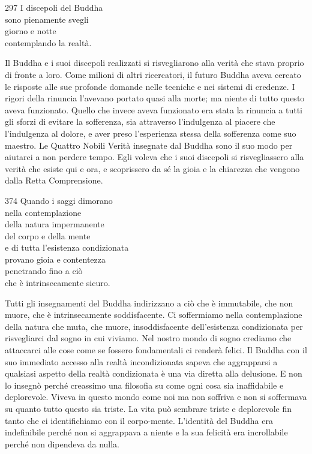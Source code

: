 
\begin{dhpVerse}{297}
\label{dhp-297}
I discepoli del Buddha\\
sono pienamente svegli\\
giorno e notte\\
contemplando la realtà.
\end{dhpVerse}

\begin{dhpRefl}
  Il Buddha e i suoi discepoli realizzati si risvegliarono alla verità che stava
  proprio di fronte a loro. Come milioni di altri ricercatori, il futuro Buddha
  aveva cercato le risposte alle sue profonde domande nelle tecniche e nei
  sistemi di credenze. I rigori della rinuncia l'avevano portato quasi alla
  morte; ma niente di tutto questo aveva funzionato. Quello che invece aveva
  funzionato era stata la rinuncia a tutti gli sforzi di evitare la sofferenza,
  sia attraverso l'indulgenza al piacere che l'indulgenza al dolore, e aver
  preso l'esperienza stessa della sofferenza come suo maestro. Le Quattro Nobili
  Verità insegnate dal Buddha sono il suo modo per aiutarci a non perdere tempo.
  Egli voleva che i suoi discepoli si risvegliassero alla verità che esiste qui
  e ora, e scoprissero da sé la gioia e la chiarezza che vengono dalla Retta
  Comprensione.
\end{dhpRefl}


\begin{dhpVerse}{374}
\label{dhp-374}
Quando i saggi dimorano\\
nella contemplazione\\
della natura impermanente\\
del corpo e della mente\\
e di tutta l'esistenza condizionata\\
provano gioia e contentezza\\
penetrando fino a ciò\\
che è intrinsecamente sicuro.
\end{dhpVerse}

\begin{dhpRefl}
  Tutti gli insegnamenti del Buddha indirizzano a ciò che è immutabile, che non
  muore, che è intrinsecamente soddisfacente. Ci soffermiamo nella
  contemplazione della natura che muta, che muore, insoddisfacente
  dell'esistenza condizionata per risvegliarci dal sogno in cui viviamo. Nel
  nostro mondo di sogno crediamo che attaccarci alle cose come se fossero
  fondamentali ci renderà felici. Il Buddha con il suo immediato accesso alla
  realtà incondizionata sapeva che aggrapparsi a qualsiasi aspetto della realtà
  condizionata è una via diretta alla delusione. E non lo insegnò perché
  creassimo una filosofia su come ogni cosa sia inaffidabile e deplorevole.
  Viveva in questo mondo come noi ma non soffriva e non si soffermava su quanto
  tutto questo sia triste. La vita può sembrare triste e deplorevole fin tanto
  che ci identifichiamo con il corpo-mente. L'identità del Buddha era
  indefinibile perché non si aggrappava a niente e la sua felicità era
  incrollabile perché non dipendeva da nulla.
\end{dhpRefl}

